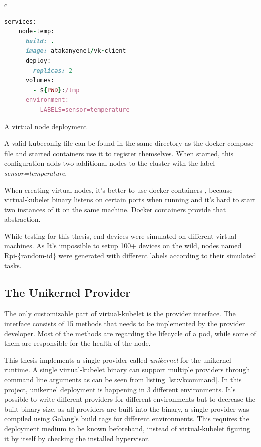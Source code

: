 \begin{code}[htpb]
  \centering
  \begin{tabular}{c}
  \begin{lstlisting}[language=ruby]
    services:
    node-temp:
      build: .
      image: atakanyenel/vk-client
      deploy:
        replicas: 2
      volumes:
        - ${PWD}:/tmp
      environment:
        - LABELS=sensor=temperature
\end{lstlisting}
\end{tabular}
\caption{A virtual node deployment}\label{fig:docker-compose}
\end{code}


A valid kubeconfig file can be found in the same directory as the docker-compose file and started containers use it to register themselves. When started, this configuration adds two additional nodes to the cluster with the label \textit{sensor=temperature}.

When creating virtual nodes, it's better to use docker containers , because virtual-kubelet binary listens on certain ports when running and it's hard to start two instances of it on the same machine. Docker containers provide that abstraction.

While testing for this thesis, end devices were simulated on different virtual machines. As It's impossible to setup 100+ devices on the wild, nodes named Rpi-\{random-id\} were generated with different labels according to their simulated tasks.

\subsection{The Unikernel Provider}
The only customizable part of virtual-kubelet is the provider interface. The interface consists of 15 methods that needs to be implemented by the provider developer. Most of the methods are regarding the lifecycle of a pod, while some of them are responsible for the health of the node. 

This thesis implements a single provider called \textit{unikernel} for the unikernel runtime. A single virtual-kubelet binary can support multiple providers through command line arguments as can be seen from listing \ref{lst:vkcommand}. In this project, unikernel deployment is happening in 3 different environments. It's possible to write different providers for different environments but to decrease the built binary size, as all providers are built into the binary, a single provider was compiled using Golang's build tags for different environments. This requires the deployment medium to be known beforehand, instead of virtual-kubelet figuring it by itself by checking the installed hypervisor.

